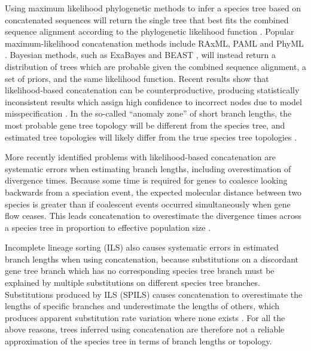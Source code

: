 \documentclass[nogrid]{MBE}%
\begin{document}
Using maximum likelihood phylogenetic methods to infer a species tree based on concatenated
sequences will return the single tree that
best fits the combined sequence alignment according to the phylogenetic likelihood function \citep{Felsenstein1981}. Popular maximum-likelihood concatenation methods include
RAxML, PAML and PhyML \citep{Stamatakis01052014,
Yang01082007,Guindon01052010}. Bayesian methods, such as ExaBayes and BEAST
\citep{Aberer01102014, Drummond2007}, will instead return a distribution of trees which are probable
given the combined sequence alignment, a set of priors, and the same likelihood function.
Recent results show that likelihood-based concatenation
can be counterproductive, producing statistically inconsistent results which assign
high confidence to incorrect nodes due to model misspecification
\citep{NYAS:NYAS12747}. In the so-called ``anomaly zone'' of short branch
lengths, the most probable gene tree topology will be different from the species
tree, and estimated tree topologies will likely differ from the true species
tree topologies \citep{journal.pgen.0020068, Kubatko01022007}.

More recently identified problems with likelihood-based concatenation are
systematic errors when estimating branch lengths, including overestimation of
divergence times. Because some time is required for genes to coalesce
looking backwards from a speciation event, the expected molecular distance
between two species is greater than if coalescent events occurred
simultaneously when
gene flow ceases. This leads concatenation to overestimate the divergence
times across a species tree in proportion to effective population size
\citep{doi:10.1146/annurev.ecolsys.33.010802.150500, Ogilvie01052016}.

Incomplete lineage sorting (ILS) also causes systematic errors in estimated
branch lengths when using concatenation, because substitutions on a discordant
gene tree branch which has no corresponding species tree branch must be
explained by multiple substitutions on different species tree branches.
Substitutions produced by ILS (SPILS) causes concatenation to overestimate the
lengths of specific branches and underestimate the lengths of others, which
produces apparent substitution rate variation where none exists
\citep{Mendes01072016}. For all the above reasons, trees inferred using
concatenation are therefore not a reliable approximation of the species tree
in terms of branch lengths or topology.
\end{document}

